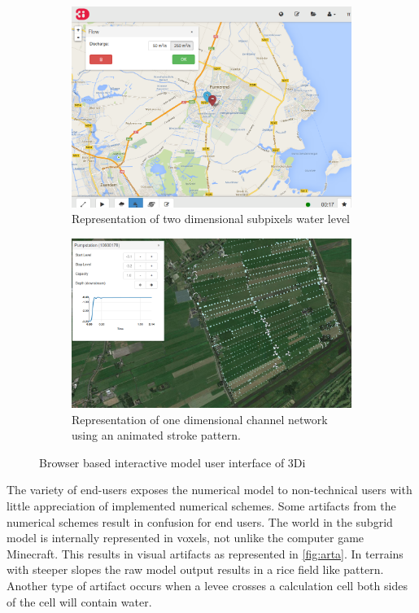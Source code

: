 \documentclass[a4paper]{article}
\DeclareRobustCommand{\threedi}{3Di~}
\begin{document}
\begin{figure}[htbp]
  \centering

  \begin{subfigure}{0.48\textwidth}
    \includegraphics[width=1\textwidth]{webgui}
    \caption{Representation of two dimensional subpixels water level}
    \label{fig:twod}
  \end{subfigure}
  \begin{subfigure}{0.48\textwidth}
    \includegraphics[width=1\textwidth]{oned}
    \caption{Representation of one dimensional channel network using an animated stroke pattern.}
    \label{fig:oned}
  \end{subfigure}
  \label{fig:gui}
  \caption{Browser based interactive model user interface of \threedi}
\end{figure}

The variety of end-users exposes the numerical model to non-technical users with little appreciation of implemented numerical schemes. Some artifacts from the numerical schemes result in confusion for end users. The world in the subgrid model is internally represented in voxels, not unlike the computer game Minecraft. This results in visual artifacts as represented in \autoref{fig:arta}. In terrains with steeper slopes the raw model output results in a rice field like pattern. Another type of artifact occurs when a levee crosses a calculation cell both sides of the cell will contain water.
\end{document}
